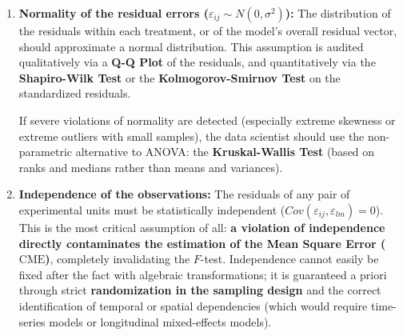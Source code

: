 \begin{enumerate}
	\item \textbf{Normality of the residual errors ($\varepsilon_{ij} \sim N(0,\sigma^2)$):} The distribution of the residuals within each treatment, or of the model's overall residual vector, should approximate a normal distribution. This assumption is audited qualitatively via a \textbf{Q-Q Plot} of the residuals, and quantitatively via the \textbf{Shapiro-Wilk Test} or the \textbf{Kolmogorov-Smirnov Test} on the standardized residuals.

	If severe violations of normality are detected (especially extreme skewness or extreme outliers with small samples), the data scientist should use the non-parametric alternative to ANOVA: the \textbf{Kruskal-Wallis Test} (based on ranks and medians rather than means and variances).

	\item \textbf{Independence of the observations:} The residuals of any pair of experimental units must be statistically independent ($Cov(\varepsilon_{ij}, \varepsilon_{lm}) = 0$). This is the most critical assumption of all: \textbf{a violation of independence directly contaminates the estimation of the Mean Square Error ($\text{CME}$)}, completely invalidating the $F$-test. Independence cannot easily be fixed after the fact with algebraic transformations; it is guaranteed a priori through strict \textbf{randomization in the sampling design} and the correct identification of temporal or spatial dependencies (which would require time-series models or longitudinal mixed-effects models).
\end{enumerate}
